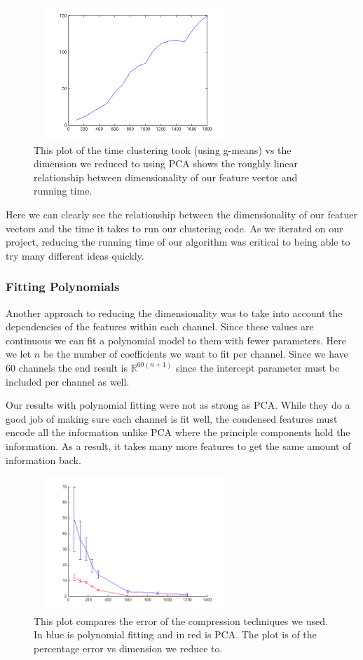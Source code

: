 \documentclass{acm_proc_article-sp}
\begin{document}
\begin{figure}
\centering
\includegraphics[width=3in,height=2in]{../poster/images/dim_vs_runningtime.png} 
\caption{This plot of the time clustering took (using g-means) vs the
  dimension we reduced to using PCA shows the roughly linear relationship 
between dimensionality of our feature vector and running
time.}
\end{figure}

Here we can clearly see the relationship between the dimensionality of our
featuer vectors and the time it takes to run our clustering code. As we
iterated on our project, reducing the running time of our algorithm was
critical to being able to try many different ideas quickly.

\subsubsection{Fitting Polynomials}

Another approach to reducing the dimensionality was to take
into account the dependencies of the features within each
channel. Since these values are continuous we can fit a
polynomial model to them with fewer parameters. Here we let $n$
be the number of coefficients we want to fit per channel. Since
we have 60 channels the end result is $\mathbb{R}^{60(n+1)}$
since the intercept parameter must be included per channel as well.

Our results with polynomial fitting were not as strong as
PCA. While they do a good job of making sure each channel is
fit well, the condensed features must encode all the
information unlike PCA where the principle components hold the
information. As a result, it takes many more features to get
the same amount of information back.

\begin{figure}
\centering
\includegraphics[width=3in,height=2in]{../poster/images/error_poly_pca.png}
\caption{This plot compares the error of the compression techniques we
  used. In blue is polynomial fitting and in red is PCA. The plot is of
  the percentage error vs dimension we reduce to.}
\end{figure}
\end{document}
